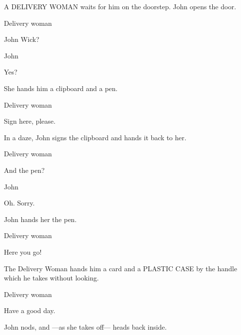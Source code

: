 \documentclass[letterpaper,literary]{screenwriter}
\title{\InfoTitle}
\author{\InfoAuthor}
\begin{document}
\coverpage

\fadein


A DELIVERY WOMAN waits for him on the doorstep.  John opens the door.

\begin{dialogue}{Delivery woman}

    John Wick?

\end{dialogue}

\begin{dialogue}{John}

    Yes?

\end{dialogue}

She hands him a clipboard and a pen.

\begin{dialogue}{Delivery woman \contd}

    Sign here, please.

\end{dialogue}

In a daze, John signs the clipboard and hands it back to her.

\begin{dialogue}{Delivery woman \contd}

    And the pen?

\end{dialogue}

\begin{dialogue}{John}

    Oh. Sorry.

\end{dialogue}

John hands her the pen.

\begin{dialogue}{Delivery woman}

    Here you go!

\end{dialogue}

The Delivery Woman hands him a card and a PLASTIC CASE by the handle
which he takes without looking.

\begin{dialogue}{Delivery woman \contd}

    Have a good day.

\end{dialogue}

John nods, and ---as she takes off--- heads back inside.
\end{document}

